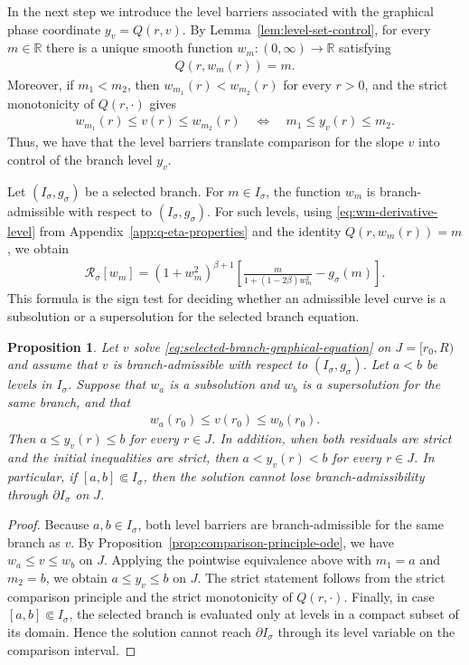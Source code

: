 \documentclass{amsart}
\theoremstyle{plain}
\newtheorem{proposition}[theorem]{Proposition}
\theoremstyle{mainintrothm}
\theoremstyle{definition}
\begin{document}
In the next step we introduce the level barriers associated with the graphical phase
coordinate $y_v=Q(r,v)$.  By Lemma~\ref{lem:level-set-control}, for every
$m\in\mathbb R$ there is a unique smooth function
$w_m:(0,\infty)\to\mathbb R$ satisfying
\begin{align*}
	Q(r,w_m(r))=m .
\end{align*}
Moreover, if $m_1<m_2$, then $w_{m_1}(r)<w_{m_2}(r)$ for every $r>0$, and the
strict monotonicity of $Q(r,\cdot)$ gives
\begin{align*}
	w_{m_1}(r)\leq v(r)\leq w_{m_2}(r)
	\quad
	\Longleftrightarrow
	\quad
	m_1\leq y_v(r)\leq m_2.
\end{align*}
Thus, we have that the level barriers translate comparison for the slope $v$ into control of the
branch level $y_v$.

\medskip

Let $(I_\sigma,g_\sigma)$ be a selected branch.  For $m\in I_\sigma$, the
function
$w_m$ is branch-admissible with respect to $(I_\sigma,g_\sigma)$.  For such
levels, using \eqref{eq:wm-derivative-level} from
Appendix~\ref{app:q-eta-properties} and the identity $Q(r,w_m(r))=m$, we obtain
\begin{align}
	\label{eq:level-barrier-residual-section}
	\mathcal R_\sigma[w_m]
	=
	(1+w_m^2)^{\beta+1}
	\left[
	\frac{m}{1+(1-2\beta)w_m^2}
	-
	g_\sigma(m)
	\right].
\end{align}
This formula is the sign test for deciding whether an admissible level curve is
a subsolution or a supersolution for the selected branch equation.

\begin{proposition}
	\label{prop:level-barrier-trapping}
	Let $v$ solve \eqref{eq:selected-branch-graphical-equation} on
	$J=[r_0,R)$ and assume that $v$ is branch-admissible with respect to
	$(I_\sigma,g_\sigma)$.  Let $a<b$ be levels in $I_\sigma$.  Suppose that
	$w_a$ is a subsolution and $w_b$ is a supersolution for the same branch, and
	that
	\begin{align*}
		w_a(r_0)\leq v(r_0)\leq w_b(r_0).
	\end{align*}
	Then $a\leq y_v(r)\leq b$ for every $r\in J$. In addition, when both residuals are strict and the initial inequalities are strict, then $a<y_v(r)<b$ for every $r\in J$. In particular, if $[a,b]\Subset I_\sigma$, then the solution cannot lose
	branch-admissibility through $\partial I_\sigma$ on $J$.
\end{proposition}

\begin{proof}
	Because $a,b\in I_\sigma$, both level barriers are branch-admissible for the
	same branch as $v$.  By
	Proposition~\ref{prop:comparison-principle-ode}, we have
	$w_a\leq v\leq w_b$ on $J$.  Applying the pointwise equivalence above with
	$m_1=a$ and $m_2=b$, we obtain $a\leq y_v\leq b$ on $J$.  The strict
	statement follows from the strict comparison principle and the strict
	monotonicity of $Q(r,\cdot)$. Finally, in case  $[a,b]\Subset I_\sigma$, the selected branch is evaluated only at
	levels in a compact subset of its domain.  Hence the solution cannot reach
	$\partial I_\sigma$ through its level variable on the comparison interval.
\end{proof}
\end{document}
